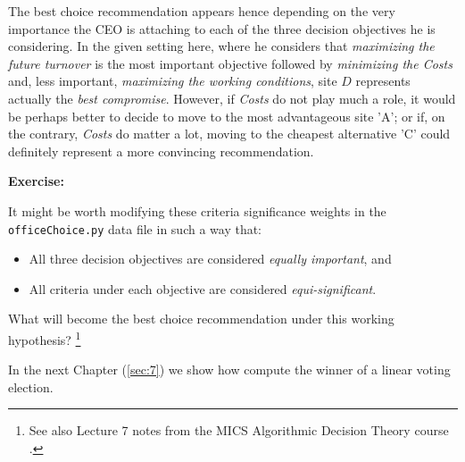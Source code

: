 The best choice recommendation appears hence depending on the very importance the CEO is attaching to each of the three decision objectives he is considering. In the given setting here, where he considers that \emph{maximizing the future turnover} is the most important objective followed by \emph{minimizing the Costs} and, less important, \emph{maximizing the working conditions}, site $D$ represents actually the \emph{best compromise}. However, if \emph{Costs} do not play much a role, it would be perhaps better to decide to move to the most advantageous site 'A'; or if, on the contrary, \emph{Costs} do matter a lot, moving to the cheapest alternative 'C' could definitely represent a more convincing recommendation. 

\noindent \textbf{Exercise:}

\noindent It might be worth modifying these criteria significance weights in the \texttt{officeChoice.py} data file in such a way that:
\begin{itemize}
\item All three decision objectives are considered \emph{equally important}, and
\item All criteria under each objective are considered \emph{equi-significant}.
\end{itemize}
What will become the best choice recommendation under this working hypothesis? \footnote{See also Lecture 7 notes from the MICS Algorithmic Decision Theory course \citep{ADT-L7}.} 

In the next Chapter (\ref{sec:7}) we show how compute the winner of a linear voting election.

\clearpage


%
